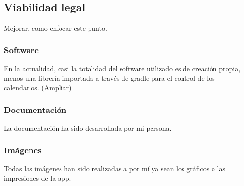 \subsection{Viabilidad legal}
Mejorar, como enfocar este punto.
\subsubsection{Software}
En la actualidad, casi la totalidad del software utilizado es de creación propia, menos una librería importada a través de gradle para el control de los calendarios.
(Ampliar)

\subsubsection{Documentación}
La documentación ha sido desarrollada por mi persona.

\subsubsection{Imágenes}
Todas las imágenes han sido realizadas a por mí ya sean los gráficos o las impresiones de la app.

